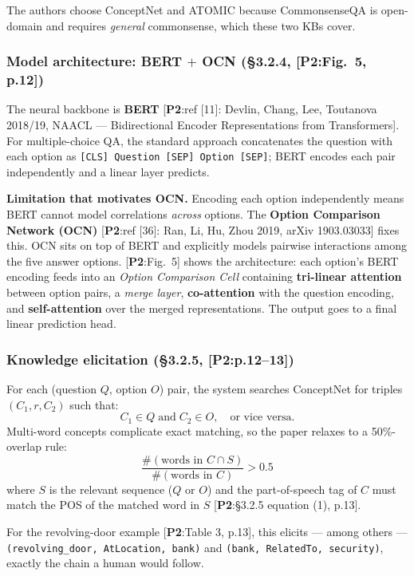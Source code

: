 \documentclass[11pt, a4paper]{article}
\newcommand{\paperref}[1]{\textcolor{srcBd}{\small[\textbf{P2}:#1]}}
\begin{document}
The authors choose ConceptNet and ATOMIC because CommonsenseQA is open-domain and requires \emph{general} commonsense, which these two KBs cover.

\subsubsection*{Model architecture: BERT $+$ OCN (§3.2.4, \paperref{Fig.\ 5, p.12})}

The neural backbone is \textbf{BERT} \paperref{ref [11]: Devlin, Chang, Lee, Toutanova 2018/19, NAACL — Bidirectional Encoder Representations from Transformers}. For multiple-choice QA, the standard approach concatenates the question with each option as \texttt{[CLS] Question [SEP] Option [SEP]}; BERT encodes each pair independently and a linear layer predicts.

\textbf{Limitation that motivates OCN.} Encoding each option independently means BERT cannot model correlations \emph{across} options. The \textbf{Option Comparison Network (OCN)} \paperref{ref [36]: Ran, Li, Hu, Zhou 2019, arXiv 1903.03033} fixes this. OCN sits on top of BERT and explicitly models pairwise interactions among the five answer options. \paperref{Fig.\ 5} shows the architecture: each option's BERT encoding feeds into an \emph{Option Comparison Cell} containing \textbf{tri-linear attention} between option pairs, a \emph{merge layer}, \textbf{co-attention} with the question encoding, and \textbf{self-attention} over the merged representations. The output goes to a final linear prediction head.

\subsubsection*{Knowledge elicitation (§3.2.5, \paperref{p.12--13})}
For each (question \(Q\), option \(O\)) pair, the system searches ConceptNet for triples \((C_1, r, C_2)\) such that:
\[
C_1 \in Q \;\text{and}\; C_2 \in O, \quad \text{or vice versa.}
\]
Multi-word concepts complicate exact matching, so the paper relaxes to a 50\%-overlap rule:
\[
\frac{\#(\text{words in } C \cap S)}{\#(\text{words in } C)} > 0.5
\]
where \(S\) is the relevant sequence (\(Q\) or \(O\)) and the part-of-speech tag of \(C\) must match the POS of the matched word in \(S\) \paperref{§3.2.5 equation (1), p.13}.

For the revolving-door example \paperref{Table 3, p.13}, this elicits — among others — \texttt{(revolving\_door, AtLocation, bank)} and \texttt{(bank, RelatedTo, security)}, exactly the chain a human would follow.
\end{document}
